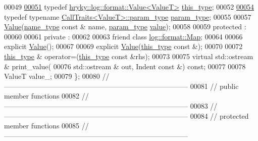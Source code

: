 \begin{DoxyCode}
00049 
\hypertarget{log__format__value_8h_source_l00051}{}\hyperlink{classhryky_1_1log_1_1format_1_1_value_aea33ef46dadd2f65199e33a9a2107d2e}{00051}     \textcolor{keyword}{typedef} \hyperlink{classhryky_1_1log_1_1format_1_1_value}{hryky::log::format::Value<ValueT>} \hyperlink{classhryky_1_1log_1_1format_1_1_value_aea33ef46dadd2f65199e33a9a2107d2e}{this_type};
00052 
\hypertarget{log__format__value_8h_source_l00054}{}\hyperlink{classhryky_1_1log_1_1format_1_1_value_a4e6e8d8330ce51833a08aa0aab7586a4}{00054}     \textcolor{keyword}{typedef} \textcolor{keyword}{typename} \hyperlink{classhryky_1_1_call_traits}{CallTraits<ValueT>::param_type} \hyperlink{classhryky_1_1log_1_1format_1_1_value_a4e6e8d8330ce51833a08aa0aab7586a4}{param_type};
00055 
00057     \hyperlink{classhryky_1_1log_1_1format_1_1_value}{Value}(\hyperlink{namespacehryky_1_1log_1_1format_ab7408d1e2ed2d648dbf9bba69eb74288}{name_type} \textcolor{keyword}{const} & name, \hyperlink{classhryky_1_1log_1_1format_1_1_value_a4e6e8d8330ce51833a08aa0aab7586a4}{param_type} \hyperlink{namespacehryky_1_1log_1_1format_a5b9af9c1a7b018d54144acfb1b8cc960}{value});
00058 
00059 \textcolor{keyword}{protected} :
00060 
00061 \textcolor{keyword}{private} :
00062 
00063     \textcolor{keyword}{friend} \textcolor{keyword}{class }\hyperlink{classhryky_1_1log_1_1format_1_1_map}{log::format::Map};
00064 
00066     \textcolor{keyword}{explicit} \hyperlink{classhryky_1_1log_1_1format_1_1_value}{Value}();
00067 
00069     \textcolor{keyword}{explicit} \hyperlink{classhryky_1_1log_1_1format_1_1_value}{Value}(\hyperlink{classhryky_1_1log_1_1format_1_1_base}{this_type} \textcolor{keyword}{const} &);
00070 
00072     \hyperlink{classhryky_1_1log_1_1format_1_1_base}{this_type} & operator=(\hyperlink{classhryky_1_1log_1_1format_1_1_base}{this_type} \textcolor{keyword}{const} &rhs);
00073 
00075     \textcolor{keyword}{virtual} std::ostream & print\_value(
00076         std::ostream & out, Indent \textcolor{keyword}{const} &) \textcolor{keyword}{const};
00077 
00078     ValueT      value\_;
00079 \};
00080 \textcolor{comment}{//
      ------------------------------------------------------------------------------}
00081 \textcolor{comment}{// public member functions}
00082 \textcolor{comment}{//
      ------------------------------------------------------------------------------}
00083 \textcolor{comment}{//
      ------------------------------------------------------------------------------}
00084 \textcolor{comment}{// protected member functions}
00085 \textcolor{comment}{//
      ------------------------------------------------------------------------------}

\end{DoxyCode}
